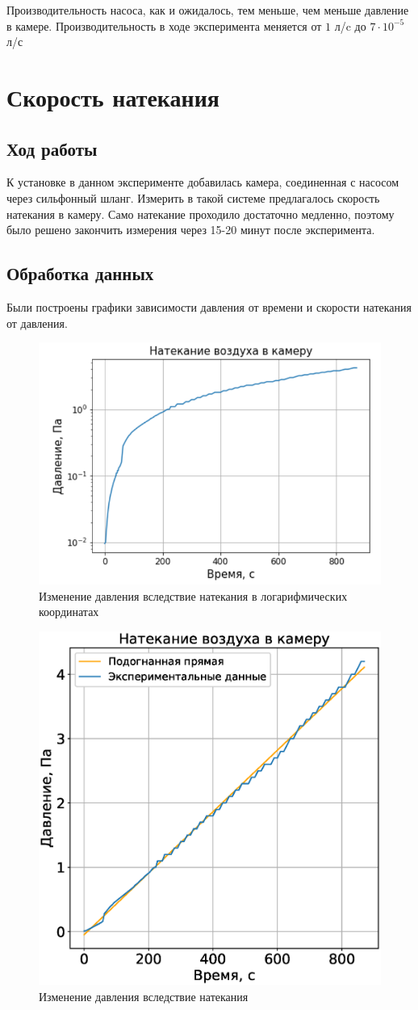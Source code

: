 \documentclass[a4paper,14pt]{extarticle}
\begin{document}
			Производительность насоса, как и ожидалось, тем меньше, чем меньше давление в камере. Производительность в ходе эксперимента меняется от $1$ л/c до $7 \cdot 10^{-5}$л/с
	\section{Скорость натекания}
		\subsection{Ход работы}
			К установке в данном эксперименте добавилась камера, соединенная с насосом через сильфонный шланг. Измерить в такой системе предлагалось скорость натекания в камеру. Само натекание проходило достаточно медленно, поэтому было решено закончить измерения через 15-20 минут после эксперимента.
		\subsection{Обработка данных}
			Были построены графики зависимости давления от времени и скорости натекания от давления.
			\begin{figure}[h!]
				\centering
				\includegraphics[width=.55\linewidth]{Screenshot_65.png}
				\caption{Изменение давления вследствие натекания в логарифмических координатах}
				\label{fig1}
			\end{figure}
		
			\begin{figure}[h!]
				\centering
				\includegraphics[width=.55\linewidth]{Lab1_3.eps}
				\caption{Изменение давления вследствие натекания}
				\label{fig1}
			\end{figure}
		
\end{document}
